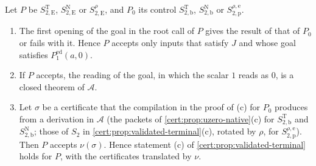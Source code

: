 \begin{proposition}\label{cert:prop:eager-validated}
Let $P$ be $S^{\mathrm T}_{2,\mathrm E}$, $S^{\mathrm N}_{2,\mathrm E}$ or
$S^{\rho}_{2,\mathrm E}$, and $P_0$ its control $S^{\mathrm T}_{2,\mathrm b}$,
$S^{\mathrm N}_{2,\mathrm b}$ or $S^{\rho,\mathrm e}_{2,\mathrm p}$.
\begin{enumerate}[label=(\alph*)]
\item The first opening of the goal in the root call of $P$ gives the result of
that of $P_0$ or fails with it. Hence $P$ accepts only inputs that satisfy $J$ and
whose goal satisfies $P^{\mathrm{ed}}_{1}(a,0)$.
\item If $P$ accepts, the reading of the goal, in which the scalar $1$ reads as
$0$, is a closed theorem of $\mathcal A$.
\item Let $\sigma$ be a certificate that the compilation in the proof of (c) for
$P_0$ produces from a derivation in $\mathcal A$ (the packets of
\cref{cert:prop:uzero-native}(c) for $S^{\mathrm T}_{2,\mathrm b}$ and
$S^{\mathrm N}_{2,\mathrm b}$; those of $S_2$ in
\cref{cert:prop:validated-terminal}(c), rotated by $\rho$, for
$S^{\rho,\mathrm e}_{2,\mathrm p}$). Then $P$ accepts $\nu(\sigma)$. Hence
statement (c) of \cref{cert:prop:validated-terminal} holds for $P$, with the
certificates translated by $\nu$.
\end{enumerate}
\end{proposition}
